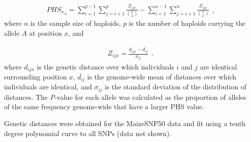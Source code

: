\begin{equation}
  \label{phs-1}
  \begin{array}{l}
  \displaystyle{
PHS_{x_A} = \sum^{p-1}_{i=1}\sum^{p}_{j=i+1} \frac{ Z_{ijx} }{ {p \choose 2} } - \sum^{n-1}_{i=1}\sum^{n}_{j=i+1} \frac{ Z_{ijx}  }{ {n \choose 2}}
  }
  \end {array} 
  \textrm{,}
\end{equation}
\noindent where $n$ is the sample size of haploids, $p$  is the number of haploids carrying the allele $A$ at position $x$, and

\begin{equation}
  \label{phs-2}
  \begin{array}{l}
  \displaystyle{
Z_{ijx} = \frac{ d_{ijx} - \bar{d_{ij}} }{ \sigma_{ij} }
  }
  \end {array} 
  \textrm{,}
\end{equation}
\noindent where $d_{ijx}$ is the genetic distance over which individuals $i$ and $j$ are identical surrounding position $x$, 
$\bar{d_{ij}}$ is the genome-wide mean of distances over which individuals  are identical, 
and $\sigma_{ij}$ is the standard deviation of the distribution of distances.  
The \emph{P}-value for each allele was calculated as the proportion of alleles of the same frequency genome-wide that have a larger PHS value. 

Genetic distances were obtained for the MaizeSNP50 data \cite[]{Ganal_2011_22174790} and fit using a tenth degree polynomial curve to all SNPs (data not shown).
 

